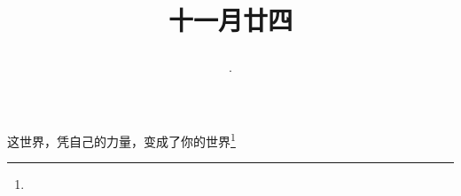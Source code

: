 \title{\date[d=24,m=12,y=2024][year:cn-y,年,month:cn,day:cn,日,·,weekday]·十一月廿四 }
这世界，凭自己的力量，变成了你的世界\footnote{ }

